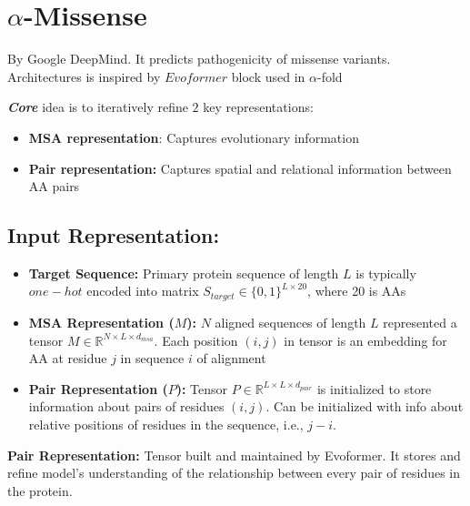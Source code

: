 \documentclass[../main.tex]{subfiles}
\begin{document}
\hrulefill

\cite{doi:10.1126/science.adg7492} \cite{Jumper2021}

\hrulefill

\section*{$\alpha$-Missense} 
By Google DeepMind. It predicts pathogenicity of missense variants. Architectures is inspired by $Evoformer$ block used in $\alpha$-fold 

\textit{\textbf{Core}} idea is to iteratively refine $2$ key representations:
\begin{itemize}
    \item \textbf{MSA representation}: Captures evolutionary information
    \item \textbf{Pair representation:} Captures spatial and relational information between AA pairs
\end{itemize}

\subsection*{Input Representation:}

\begin{itemize}
    \item \textbf{Target Sequence:} Primary protein sequence of length $L$ is typically $one-hot$ encoded into matrix $S_{target} \in \{0, 1\}^{L \times 20}$, where 20 is AAs
    \item \textbf{MSA Representation ($M$):} $N$ aligned sequences of length $L$ represented a tensor $M \in \mathbb{R}^{N \times L \times d_{msa}}$. Each position $(i, j)$ in tensor is an embedding for AA at residue $j$ in sequence $i$ of alignment
    \item \textbf{Pair Representation ($P$):} Tensor $P \in \mathbb{R}^{L \times L \times d_{pair}}$ is initialized to store information about pairs of residues $(i, j)$. Can be initialized with info about relative positions of residues in the sequence, i.e., $j - i$.
\end{itemize}

\textbf{Pair Representation:} Tensor built and maintained by Evoformer. It stores and refine model's understanding of the relationship between every pair of residues in the protein.

\vspace{0.3cm}
\end{document}
